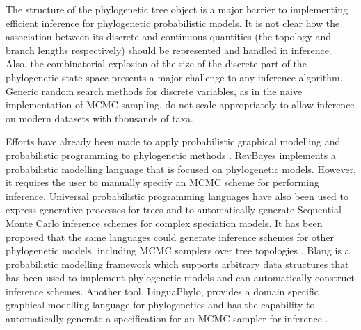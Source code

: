 \documentclass[oupdraft]{sysbio_sse}
\let\cite\citep
\begin{document}
The structure of the phylogenetic tree object is a major barrier to implementing efficient inference for phylogenetic probabilistic models. It is not clear how the association between its discrete and continuous quantities (the topology and branch lengths respectively) should be represented and handled in inference. Also, the combinatorial explosion of the size of the discrete part of the phylogenetic state space presents a major challenge to any inference algorithm. Generic random search methods for discrete variables, as in the naive implementation of MCMC sampling, do not scale appropriately to allow inference on modern datasets with thousands of taxa.

Efforts have already been made to apply probabilistic graphical modelling and probabilistic programming to phylogenetic methods
\cite{hohna2014probabilistic, fourment2019evaluating, ronquist2021universal, drummond2023linguaphylo}. RevBayes \cite{hohna2016revbayes} implements a probabilistic modelling language that is focused on phylogenetic models. However, it requires the user to manually specify an MCMC scheme for performing inference. Universal probabilistic programming languages have also been used to express generative processes for trees and to automatically generate Sequential Monte Carlo inference schemes for complex speciation models. It has been proposed that the same languages could generate inference schemes for other phylogenetic models, including MCMC samplers over tree topologies \cite{ronquist2021universal, senderov2024treeppl}. Blang \cite{bouchard2022blang} is a probabilistic modelling framework which supports arbitrary data structures that has been used to implement phylogenetic models and can automatically construct inference schemes. Another tool, LinguaPhylo, provides a domain specific graphical modelling language for phylogenetics and has the capability to automatically generate a specification for an MCMC sampler for inference \cite{drummond2023linguaphylo}.
\end{document}
